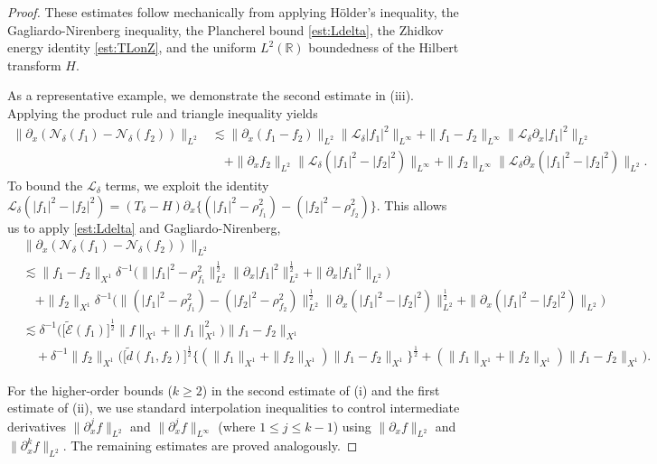\documentclass{amsart}
\numberwithin{equation}{section}
\newcommand{\R}{\mathbb{R}}
\newcommand{\Td}{T_{\delta}}
\begin{document}
\begin{proof}
These estimates follow mechanically from applying H\"older's inequality, the Gagliardo-Nirenberg inequality, the Plancherel bound \eqref{est:Ldelta}, the Zhidkov energy identity \eqref{est:TLonZ}, and the uniform $L^2(\R)$ boundedness of the Hilbert transform $H$.

As a representative example, we demonstrate the second estimate in (iii). Applying the product rule and triangle inequality yields
\begin{align*}
\| \partial_x(\mathcal{N}_\delta(f_1)-\mathcal{N}_\delta(f_2))\|_{L^2} 
&\lesssim \| \partial_x(f_1-f_2)\|_{L^2}\| \mathcal{L}_\delta|f_1|^2\|_{L^\infty}+\| f_1-f_2\|_{L^\infty}\| \mathcal{L}_\delta\partial_x|f_1|^2\|_{L^2} \\
&\quad +\| \partial_xf_2\|_{L^2}\| \mathcal{L}_\delta(|f_1|^2-|f_2|^2)\|_{L^\infty} +\| f_2\|_{L^\infty}\| \mathcal{L}_\delta\partial_x(|f_1|^2-|f_2|^2)\|_{L^2} .
\end{align*}
To bound the $\mathcal{L}_\delta$ terms, we exploit the identity $\mathcal{L}_{\delta}(|f_{1}|^{2}-|f_{2}|^{2}) = (\Td -H)\partial_{x}\big\{ (|f_{1}|^{2}-\rho_{f_1}^{2})-(|f_{2}|^{2}-\rho_{f_2}^{2}) \big\}$. This allows us to apply \eqref{est:Ldelta} and Gagliardo-Nirenberg,
\begin{align*}
&\| \partial_x(\mathcal{N}_\delta(f_1)-\mathcal{N}_\delta(f_2))\|_{L^2} \\
&\lesssim \| f_1-f_2\|_{X^1}\delta^{-1}\Big( \big\| |f_1|^2-\rho_{f_1}^2\big\|_{L^2}^{\frac12}\| \partial_x|f_1|^2\|_{L^2}^{\frac12}+\| \partial_x|f_1|^2\|_{L^2}\Big) \\
&\quad +\| f_2\|_{X^1}\delta^{-1}\Big( \big\| (|f_1|^2-\rho_{f_1}^2)-(|f_2|^2-\rho_{f_2}^2)\big\|_{L^2}^{\frac12}\| \partial_x(|f_1|^2-|f_2|^2)\|_{L^2}^{\frac12}+\| \partial_x(|f_1|^2-|f_2|^2)\|_{L^2}\Big) \\
&\lesssim \delta^{-1}\Big( \big[ \widetilde{\mathcal{E}}(f_1)\big]^{\frac12}\|f \|_{X^1} +\| f_1 \|_{X^1}^2 \Big) \| f_1-f_2\|_{X^1} \\
&\quad + \delta^{-1} \| f_2\|_{X^1}
 \Big( \big[ \widetilde{d}(f_1,f_2)\big]^{\frac12} \big\{ ( \| f_1\|_{X^1} +  \| f_2\|_{X^1}) \| f_1-f_2 \|_{X^1}\big\}^{\frac12} + (\| f_1\|_{X^1}+\| f_2\|_{X^1})\| f_1-f_2\|_{X^1}\Big) .
\end{align*}

For the higher-order bounds ($k\geq 2$) in the second estimate of (i) and the first estimate of (ii), we use standard interpolation inequalities to control intermediate derivatives $\| \partial_x^jf\|_{L^2}$ and $\| \partial_x^jf\|_{L^\infty}$ (where $1\leq j\leq k-1$) using $\| \partial_xf\|_{L^2}$ and $\| \partial_x^kf\|_{L^2}$. The remaining estimates are proved analogously.
\end{proof}
\end{document}
